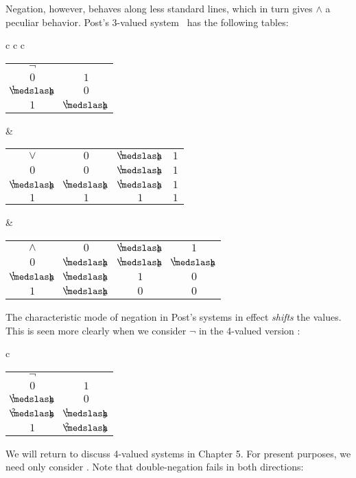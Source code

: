 \noindent Negation, however, behaves along less standard lines, which in turn gives $\wedge$ a peculiar behavior. Post's 3-valued system \Pthree\ has the following tables:
\begin{singlespace}
\begin{longtable}{c c c}
		\begin{tabular}{c | c}
			$\neg$ &  \\
			\cline{1-2} 
			$0$ & $1$ \\ 
			$\oneHalf$ & $0$ \\
			$1$ & $\oneHalf$ \\
		\end{tabular} 
		&
		\begin{tabular}{c | c c c}
			$\vee$ & 			$0$ & 				$\oneHalf$ & 	$1$ \\
			\cline{1-4} 
			$0$ & 				$0$ 			 & 	$\oneHalf$ & 	$1$ \\
			$\oneHalf$ & 	$\oneHalf$ &	$\oneHalf$ & 	$1$ \\
			$1$ & 				$1$ 			 & 	$1$ 			 & 	$1$ \\
		\end{tabular}
		&
		\begin{tabular}{c | c c c}
			$\wedge$ & 		$0$ & 				$\oneHalf$ & 	$1$ \\
			\cline{1-4} 
			$0$ & 				$\oneHalf$ & 	$\oneHalf$ & 	$\oneHalf$ \\
			$\oneHalf$ & 	$\oneHalf$ &	$1$ 			 & 	$0$ \\
			$1$ & 				$\oneHalf$ & 	$0$ 			 & 	$0$ \\
		\end{tabular}
\end{longtable}
\end{singlespace}
\noindent The characteristic mode of negation in Post's systems in effect \emph{shifts} the values. This is seen more clearly when we consider $\neg$ in the 4-valued version \Pfour:
\begin{singlespace}
\begin{longtable}{c}
		\begin{tabular}{c | c}
			$\neg$ &  \\
			\cline{1-2} 
			$0$ 					& $1$ \\ 
			$\oneThird$ 	& $0$ \\
			$\twoThirds$ 	& $\oneThird$ \\
			$1$ 					& $\twoThirds$ \\
		\end{tabular} 
\end{longtable}
\end{singlespace}
\noindent We will return to discuss 4-valued systems in Chapter 5. For present purposes, we need only consider \Pthree. Note that double-negation fails in both directions:

